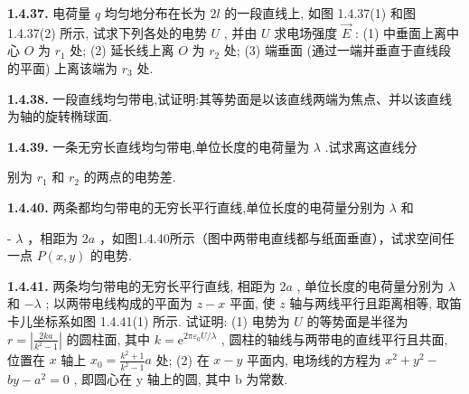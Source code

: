 \newpage
\textbf{1.4.37.} 电荷量 $q$ 均匀地分布在长为 $2l$ 的一段直线上, 如图 1.4.37(1) 和图 1.4.37(2) 所示, 试求下列各处的电势 $U$ , 并由 $U$ 求电场强度 $\vec{E}$ : (1) 中垂面上离中心 $O$ 为 $r_1$ 处; (2) 延长线上离 $O$ 为 $r_2$ 处; (3) 端垂面 (通过一端并垂直于直线段的平面) 上离该端为 $r_3$ 处.



\begin{center}
\end{center}

\begin{center}
\end{center}

\vfill

\textbf{1.4.38.} 一段直线均匀带电,试证明:其等势面是以该直线两端为焦点、并以该直线为轴的旋转椭球面.

\vfill

\newpage
\textbf{1.4.39.} 一条无穷长直线均匀带电,单位长度的电荷量为 $\lambda$ .试求离这直线分


别为 $r_{1}$ 和 $r_{2}$ 的两点的电势差.

\vfill

\textbf{1.4.40.} 两条都均匀带电的无穷长平行直线,单位长度的电荷量分别为 $\lambda$ 和


- $\lambda$ ，相距为 $2a$ ，如图1.4.40所示（图中两带电直线都与纸面垂直），试求空间任一点 $P(x,y)$ 的电势.

\begin{center}
\end{center}

\vfill

\newpage
\textbf{1.4.41.} 两条均匀带电的无穷长平行直线, 相距为 $2a$ , 单位长度的电荷量分别为 $\lambda$ 和 $-\lambda$ ; 以两带电线构成的平面为 $z - x$ 平面, 使 $z$ 轴与两线平行且距离相等, 取笛卡儿坐标系如图 1.4.41(1) 所示. 试证明: (1) 电势为 $U$ 的等势面是半径为 $\displaystyle r = \left| \frac{2ka}{k^2 - 1} \right|$ 的圆柱面, 其中 $k = \mathrm{e}^{2\pi \varepsilon_0 U / \lambda}$ , 圆柱的轴线与两带电的直线平行且共面, 位置在 $x$ 轴上 $\displaystyle x_0 = \frac{k^2 + 1}{k^2 - 1} a$ 处; (2) 在 $x - y$ 平面内, 电场线的方程为 $x^2 + y^2 -$ $by - a^{2} = 0$ , 即圆心在 y 轴上的圆, 其中 b 为常数.


\begin{center}
\end{center}

